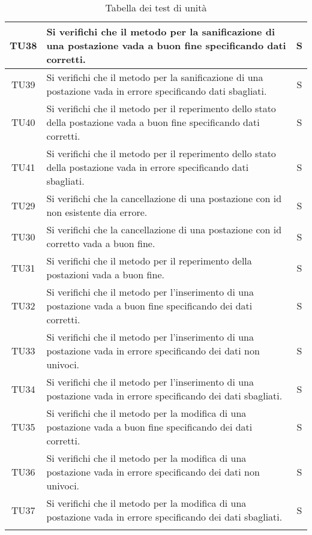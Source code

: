 \begin{center}
\begin{longtable}{|c|p{10cm}|c|}
			TU38 & Si verifichi che il metodo per la sanificazione di una postazione vada a buon fine specificando dati corretti. & S \\	
			\hline
			TU39 & Si verifichi che il metodo per la sanificazione di una postazione vada in errore specificando dati sbagliati. & S \\	
			\hline
			TU40 & Si verifichi che il metodo per il reperimento dello stato della postazione vada a buon fine specificando dati corretti. & S \\	
			\hline
			TU41 & Si verifichi che il metodo per il reperimento dello stato della postazione vada in errore specificando dati sbagliati. & S \\	
			\hline
			TU29 & Si verifichi che la cancellazione di una postazione con id non esistente dia errore. & S \\	
			\hline
			TU30 & Si verifichi che la cancellazione di una postazione con id corretto vada a buon fine. & S \\	
			\hline
			TU31 & Si verifichi che il metodo per il reperimento della postazioni vada a buon fine. & S \\	
			\hline
			TU32 & Si verifichi che il metodo per l'inserimento di una postazione vada a buon fine specificando dei dati corretti. & S \\	
			\hline
			TU33 & Si verifichi che il metodo per l'inserimento di una postazione vada in errore specificando dei dati non univoci. & S \\	
			\hline
			TU34 & Si verifichi che il metodo per l'inserimento di una postazione vada in errore specificando dei dati sbagliati. & S \\	
			\hline
			TU35 & Si verifichi che il metodo per la modifica di una postazione vada a buon fine specificando dei dati corretti. & S \\	
			\hline
			TU36 & Si verifichi che il metodo per la modifica di una postazione vada in errore specificando dei dati non univoci. & S \\	
			\hline
			TU37 & Si verifichi che il metodo per la modifica di una postazione vada in errore specificando dei dati sbagliati. & S \\	
			\hline
			\hiderowcolors
			\caption{Tabella dei test di unità}		
		\end{longtable}	
	\end{center}
